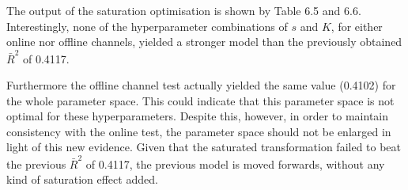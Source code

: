 \documentclass[11pt, a4paper]{article}
\begin{document}
The output of the saturation optimisation is shown by Table 6.5 and 6.6. Interestingly, none of the hyperparameter combinations of $s$ and $K$, for either online nor offline channels, yielded a stronger model than the previously obtained $\bar{R}^2$
 of 0.4117.

Furthermore the offline channel test actually yielded the same value (0.4102) for the whole parameter space. This could indicate that this parameter space is not optimal for these hyperparameters. Despite this, however, in order to maintain consistency with the online test, the parameter space should not be enlarged in light of this new evidence. Given that the saturated transformation failed to beat the previous $\bar{R}^2$
 of 0.4117, the previous model is moved forwards, without any kind of saturation effect added.
\end{document}
